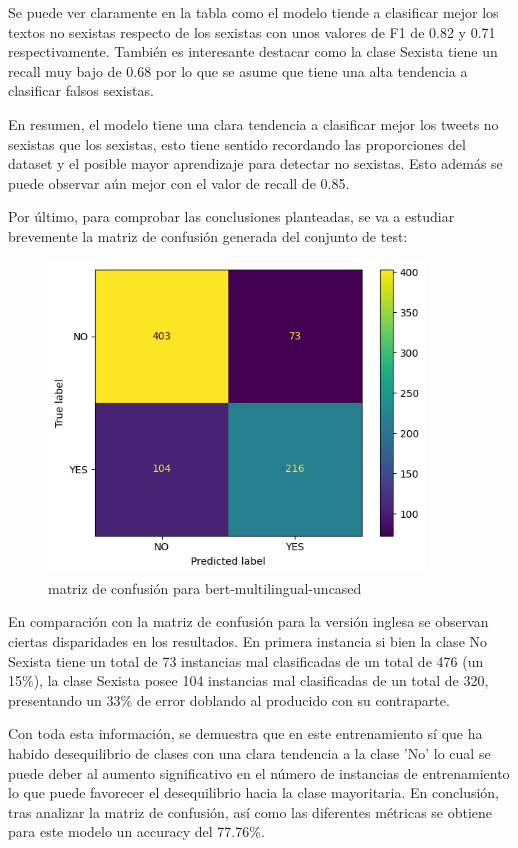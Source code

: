 Se puede ver claramente en la tabla como el modelo tiende a clasificar mejor los textos no sexistas respecto de los sexistas con unos valores de F1 de 0.82 y 0.71 respectivamente. También es interesante destacar como la clase Sexista tiene un recall muy bajo de 0.68 por lo que se asume que tiene una alta tendencia a clasificar falsos sexistas.

En resumen, el modelo tiene una clara tendencia a clasificar mejor los tweets no sexistas que los sexistas, esto tiene sentido recordando las proporciones del dataset y el posible mayor aprendizaje para detectar no sexistas. Esto además se puede observar aún mejor con el valor de recall de 0.85.

Por último, para comprobar las conclusiones planteadas, se va a estudiar brevemente la matriz de confusión generada del conjunto de test:

\begin{figure}[H]
    \centering
    \includegraphics[width=10cm]{imagenes/Evaluacion/confusion_matrix/bert_base_multilingual-uncased-all-dirty.png}
    \caption{\centering matriz de confusión para bert-multilingual-uncased}
\end{figure}

En comparación con la matriz de confusión para la versión inglesa se observan ciertas disparidades en los resultados. En primera instancia si bien la clase No Sexista tiene un total de 73 instancias mal clasificadas de un total de 476 (un 15\%), la clase Sexista posee 104 instancias mal clasificadas de un total de 320, presentando un 33\% de error doblando al producido con su contraparte. 

Con toda esta información, se demuestra que en este entrenamiento sí que ha habido desequilibrio de clases con una clara tendencia a la clase 'No' lo cual se puede deber al aumento significativo en el número de instancias de entrenamiento lo que puede favorecer el desequilibrio hacia la clase mayoritaria. En conclusión, tras analizar la matriz de confusión, así como las diferentes métricas se obtiene para este modelo un accuracy del 77.76\%.


